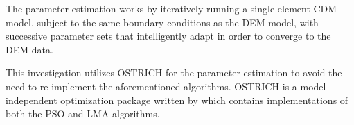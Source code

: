 The parameter estimation works by iteratively running a single element CDM model, subject to the same boundary conditions as the DEM model, with successive parameter sets that intelligently adapt in order to converge to the DEM data. 

This investigation utilizes OSTRICH for the parameter estimation to avoid the need to re-implement the aforementioned algorithms. OSTRICH is a model-independent optimization package written by \citet{matott_ostrich:_2016} which contains implementations of both the PSO and LMA algorithms.

